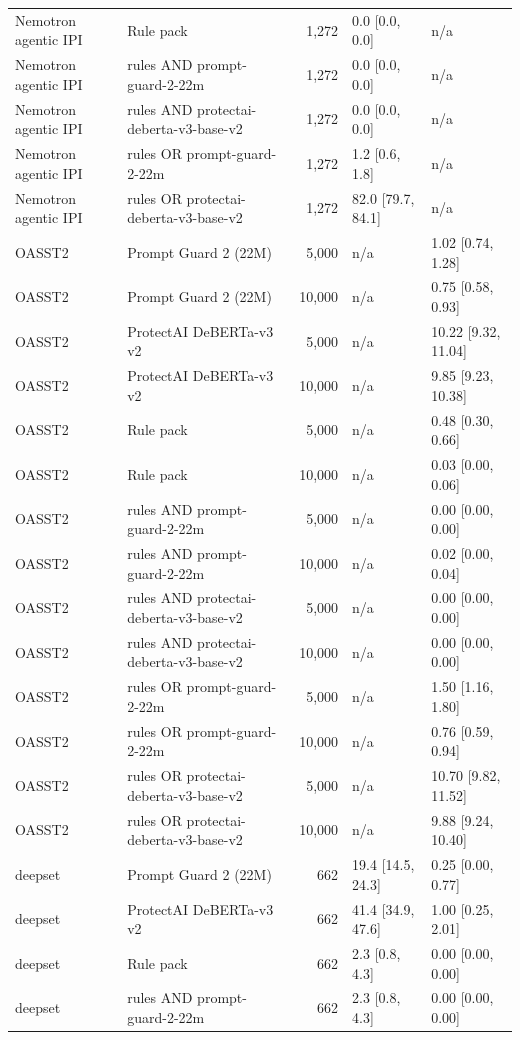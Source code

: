 \begin{tabular}{llrll}
Nemotron agentic IPI & Rule pack & 1,272 & 0.0 [0.0, 0.0] & n/a \\
Nemotron agentic IPI & rules AND prompt-guard-2-22m & 1,272 & 0.0 [0.0, 0.0] & n/a \\
Nemotron agentic IPI & rules AND protectai-deberta-v3-base-v2 & 1,272 & 0.0 [0.0, 0.0] & n/a \\
Nemotron agentic IPI & rules OR prompt-guard-2-22m & 1,272 & 1.2 [0.6, 1.8] & n/a \\
Nemotron agentic IPI & rules OR protectai-deberta-v3-base-v2 & 1,272 & 82.0 [79.7, 84.1] & n/a \\
OASST2 & Prompt Guard 2 (22M) & 5,000 & n/a & 1.02 [0.74, 1.28] \\
OASST2 & Prompt Guard 2 (22M) & 10,000 & n/a & 0.75 [0.58, 0.93] \\
OASST2 & ProtectAI DeBERTa-v3 v2 & 5,000 & n/a & 10.22 [9.32, 11.04] \\
OASST2 & ProtectAI DeBERTa-v3 v2 & 10,000 & n/a & 9.85 [9.23, 10.38] \\
OASST2 & Rule pack & 5,000 & n/a & 0.48 [0.30, 0.66] \\
OASST2 & Rule pack & 10,000 & n/a & 0.03 [0.00, 0.06] \\
OASST2 & rules AND prompt-guard-2-22m & 5,000 & n/a & 0.00 [0.00, 0.00] \\
OASST2 & rules AND prompt-guard-2-22m & 10,000 & n/a & 0.02 [0.00, 0.04] \\
OASST2 & rules AND protectai-deberta-v3-base-v2 & 5,000 & n/a & 0.00 [0.00, 0.00] \\
OASST2 & rules AND protectai-deberta-v3-base-v2 & 10,000 & n/a & 0.00 [0.00, 0.00] \\
OASST2 & rules OR prompt-guard-2-22m & 5,000 & n/a & 1.50 [1.16, 1.80] \\
OASST2 & rules OR prompt-guard-2-22m & 10,000 & n/a & 0.76 [0.59, 0.94] \\
OASST2 & rules OR protectai-deberta-v3-base-v2 & 5,000 & n/a & 10.70 [9.82, 11.52] \\
OASST2 & rules OR protectai-deberta-v3-base-v2 & 10,000 & n/a & 9.88 [9.24, 10.40] \\
deepset & Prompt Guard 2 (22M) & 662 & 19.4 [14.5, 24.3] & 0.25 [0.00, 0.77] \\
deepset & ProtectAI DeBERTa-v3 v2 & 662 & 41.4 [34.9, 47.6] & 1.00 [0.25, 2.01] \\
deepset & Rule pack & 662 & 2.3 [0.8, 4.3] & 0.00 [0.00, 0.00] \\
deepset & rules AND prompt-guard-2-22m & 662 & 2.3 [0.8, 4.3] & 0.00 [0.00, 0.00] \\

\end{tabular}

